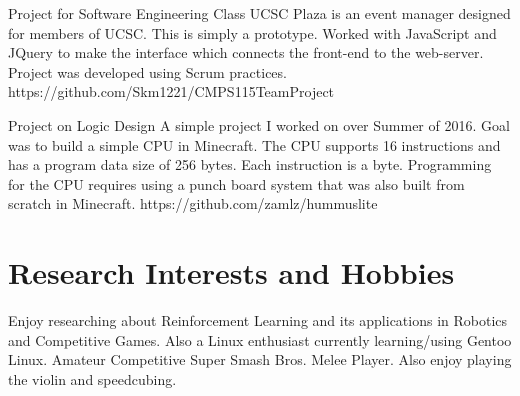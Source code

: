 \documentclass{cv}
\begin{document}
\begin{adjustwidth}{0.5cm}{0.5cm}
{Project for Software Engineering Class}
{UCSC Plaza is an event manager designed for members of UCSC. This is simply
a prototype. Worked with JavaScript and JQuery to make the interface which
connects the front-end to the web-server. Project was developed using Scrum
practices.}
{https://github.com/Skm1221/CMPS115TeamProject}

{Project on Logic Design}
{A simple project I worked on over Summer of 2016. Goal was to build a simple
CPU in Minecraft. The CPU supports 16 instructions and has a program data
size of 256 bytes. Each instruction is a byte. Programming for the CPU
requires using a punch board system that was also built from scratch in
Minecraft.}
{https://github.com/zamlz/hummuslite}
\end{adjustwidth}

\section{Research Interests and Hobbies}
\begin{adjustwidth}{0.5cm}{0.5cm}
Enjoy researching about Reinforcement Learning and its applications
in Robotics and Competitive Games. Also a Linux enthusiast 
currently learning/using Gentoo Linux. Amateur Competitive Super Smash
Bros. Melee Player. Also enjoy playing the violin and speedcubing.

\end{adjustwidth}
\end{document}
